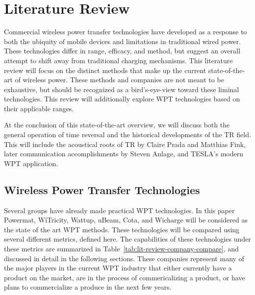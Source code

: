 \chapter{Literature Review}
\label{ch:lit-review}

Commercial wireless power transfer technologies have developed as a response to both the ubiquity of mobile devices and limitations in traditional wired power. These technologies differ in range, efficacy, and method, but suggest an overall attempt to shift away from traditional charging mechanisms. This literature review will focus on the distinct methods that make up the current state-of-the-art of wireless power. These methods and companies are not meant to be exhaustive, but should be recognized as a bird's-eye-view toward these liminal technologies. This review will additionally explore WPT technologies based on their applicable ranges.

At the conclusion of this state-of-the-art overview, we will discuss both the general operation of time reversal and the historical developments of the TR field. This will include the acoustical roots of TR by Claire Prada and Matthias Fink, later communication accomplishments by Steven Anlage, and TESLA's modern WPT application.

\section{Wireless Power Transfer Technologies}

Several groups have already made practical WPT technologies. In this paper Powermat, WiTricity, Wattup, uBeam, Cota, and Wicharge will be considered as the state of the art WPT methods. These technologies will be compared using several different metrics, defined here. The capabilities of these technologies under these metrics are summarized in Table~\ref{tab:lit-review-company-compare}, and discussed in detail in the following sections. These companies represent many of the major players in the current WPT industry that either currently have a product on the market, are in the process of commericalizing a product, or have plans to commercialize a produce in the next few years.

